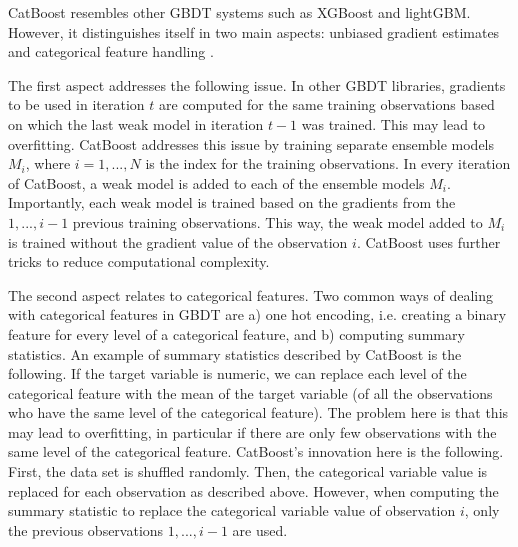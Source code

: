 \documentclass{article}
\newcommand{\comment}[1]{}
\begin{document}
	CatBoost resembles other GBDT systems such as XGBoost and lightGBM. However, it distinguishes itself in two main aspects: unbiased gradient estimates and categorical feature handling \cite{dorogush_catboost:_2018}. 
	
	The first aspect addresses the following issue. In other GBDT libraries, gradients to be used in iteration $t$ are computed for the same training observations based on which the last weak model in iteration $t-1$ was trained. This may lead to overfitting. CatBoost addresses this issue by training separate ensemble models $M_i$, where $i = 1, ..., N$ is the index for the training observations. In every iteration of CatBoost, a weak model is added to each of the ensemble models $M_i$. Importantly, each weak model is trained based on the gradients from the $1, ..., i-1$ previous training observations. This way, the weak model added to $M_i$ is trained without the gradient value of the observation $i$. CatBoost uses further tricks to reduce computational complexity.
	
	The second aspect relates to categorical features. Two common ways of dealing with categorical features in GBDT are a) one hot encoding, i.e. creating a binary feature for every level of a categorical feature, and b) computing summary statistics. An example of summary statistics described by CatBoost is the following. If the target variable is numeric, we can  replace each level of the categorical feature with the mean of the target variable (of all the observations who have the same level of the categorical feature). The problem here is that this may lead to overfitting, in particular if there are only few observations with the same level of the categorical feature. CatBoost's innovation here is the following. First, the data set is shuffled randomly. Then, the categorical variable value is replaced for each observation as described above. However, when computing the summary statistic to replace the categorical variable value of observation $i$, only the previous observations $1, ..., i-1$ are used.

	
	\comment{
		
	\begin{align}
		\mathrm{L^{(t)}} = \sum_{i=1}^n l(y_i, \hat{y_i}^{(t-1)} + f_t(\textbf{x}_i)), 
	\end{align}

		
	To fit each tree, the gradient of a differentiable loss function is used. Non-numerical features are generally converted to numerical features and therefore the gradient can also be used for categorical variables.
		
		
	- Questions:
		- Errors made by the ensemble (?) classifier
		- All variables are converted to numerical features and therefore
		- Is the structure tree learned once? Or is a new tree structure fitted in every iteration? (Are the gradients also used for the tree structure or only for the tresholds?)
		- How is the gradient used for numerical variables?
		- Are non-numerical features are generally converted to numerical features???
		
	}
\end{document}
